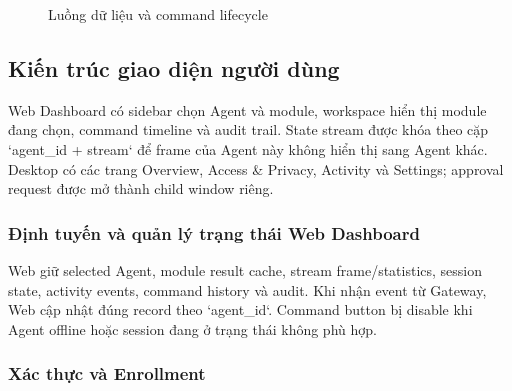 \documentclass[12pt,a4paper]{article}
\begin{document}
\begin{figure}[H]
\centering
{}
\caption{Luồng dữ liệu và command lifecycle}
\label{fig:dataflow}
\end{figure}

\subsection{Kiến trúc giao diện người dùng}

Web Dashboard có sidebar chọn Agent và module, workspace hiển thị module đang chọn, command timeline và audit trail. State stream được khóa theo cặp `agent_id + stream` để frame của Agent này không hiển thị sang Agent khác. Desktop có các trang Overview, Access \& Privacy, Activity và Settings; approval request được mở thành child window riêng.

\subsubsection{Định tuyến và quản lý trạng thái Web Dashboard}

Web giữ selected Agent, module result cache, stream frame/statistics, session state, activity events, command history và audit. Khi nhận event từ Gateway, Web cập nhật đúng record theo `agent_id`. Command button bị disable khi Agent offline hoặc session đang ở trạng thái không phù hợp.

\subsubsection{Xác thực và Enrollment}
\end{document}
